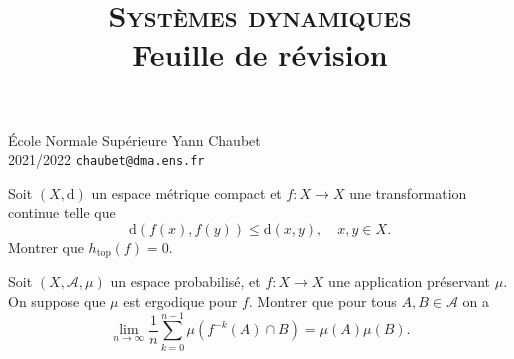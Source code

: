 \documentclass[a4paper,10pt,openany]{article}
\title{\textsc{Syst\`emes dynamiques} \\ Feuille de r\'evision}
\date{}
\author{}
\theoremstyle{plain}
\theoremstyle{definition}
\newcommand{\dd}{\mathrm{d}}
\begin{document}
{\noindent \'Ecole Normale Sup\'erieure  \hfill Yann Chaubet } \\
{2021/2022 \hfill \texttt{chaubet@dma.ens.fr}}

{\let\newpage\relax\maketitle}
\maketitle

 \vspace{1.5mm} 

\noindent
Soit $(X, \dd)$ un espace m\'etrique compact et $f : X \to X$ une transformation continue telle que 
$$
\dd(f(x), f(y)) \leq \dd(x,y), \quad x, y \in X.
$$
Montrer que $h_\mathrm{top}(f) = 0.$
\vspace{0.6cm}

 \vspace{1.5mm} 

\noindent Soit $(X, \mathscr{A}, \mu)$ un espace probabilis\'e, et $f : X \to X$ une application pr\'eservant $\mu$. On suppose que $\mu$ est ergodique pour $f$. Montrer que pour tous $A, B \in \mathscr{A}$ on a 
$$
\lim_{n \to \infty} \frac{1}{n} \sum_{k=0}^{n-1} \mu\left(f^{-k}(A) \cap B\right) = \mu(A) \mu(B).
$$

\vspace{0.6cm}

 \vspace{1.5mm} 
\end{document}

